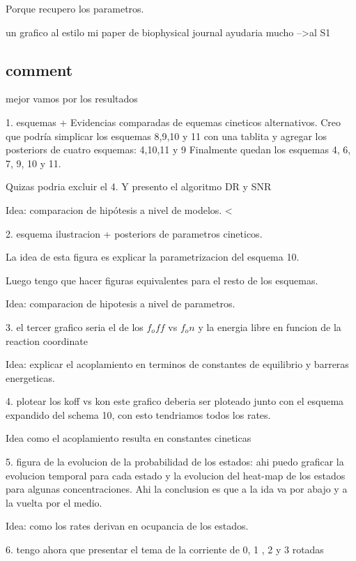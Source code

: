 \documentclass[a4paper,12pt]{article}
\begin{document}
		Porque recupero los parametros. 
		
		un grafico al estilo mi paper de biophysical journal ayudaria mucho -->al S1
		
		
	
	\subsection{comment}
		mejor vamos por los resultados
		
		1. esquemas  + Evidencias comparadas de equemas cineticos alternativos. 
		Creo que podría simplicar los esquemas 8,9,10 y 11 con una tablita y agregar los posteriors de cuatro esquemas: 4,10,11 y 9
		Finalmente quedan los esquemas 4, 6, 7, 9, 10 y 11. 
		
		Quizas podria excluir el 4.  
		Y presento el algoritmo DR y SNR
		
		Idea: comparacion 	de hipótesis a nivel de modelos. 
		< 
		
		
		2. esquema ilustracion + posteriors de parametros cineticos. 
		
		La idea de esta figura es explicar la parametrizacion del esquema 10. 
		
		
		Luego tengo que hacer figuras equivalentes para el resto de los esquemas. 
		
		Idea: comparacion de hipotesis a nivel de parametros. 
		
		
		
		3. el tercer grafico seria el de los $f_off$ vs $f_on$ y la energia libre en funcion de la reaction coordinate
		
		Idea: explicar el acoplamiento en terminos de constantes de equilibrio y barreras energeticas. 
		
		
		
		4.  plotear los koff vs kon
		este grafico deberia ser ploteado junto con el esquema expandido del schema 10, con esto tendriamos todos los rates. 
		
		Idea como el acoplamiento resulta en constantes cineticas
		
		5. figura de la evolucion de la probabilidad de los estados: 
		ahi puedo graficar la evolucion temporal para cada estado y la evolucion del heat-map de los estados para algunas concentraciones. 
		Ahi la conclusion es que a la ida va por abajo y a la vuelta por el medio. 
		
		Idea: como los rates derivan en ocupancia de los estados. 
		
		
		6. tengo ahora que presentar el tema de la corriente de 0, 1 , 2 y 3 rotadas 
		
\end{document}
